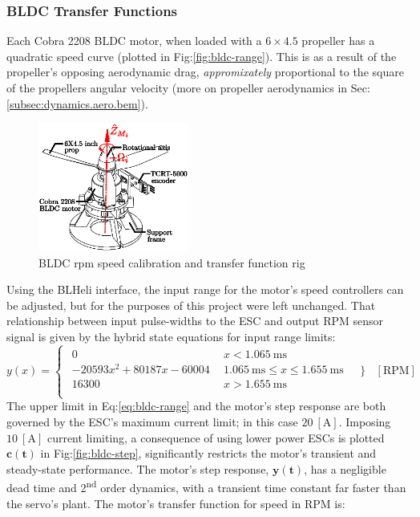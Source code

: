 \subsubsection*{BLDC Transfer Functions}
Each Cobra 2208 BLDC motor, when loaded with a $6\times4.5$ propeller has a quadratic speed curve (plotted in Fig:\ref{fig:bldc-range}). This is as a result of the propeller's opposing aerodynamic drag, \emph{appromixately} proportional to the square of the propellers angular velocity (more on propeller aerodynamics in Sec:\ref{subsec:dynamics.aero.bem}).
\begin{figure}[htbp]
\centering
\includegraphics[width=0.44\textwidth]{figs/bldc-rpm}
\caption{BLDC rpm speed calibration and transfer function rig}
\label{fig:bldc-rpm}
\vspace{-16pt}
\end{figure}
\par
Using the BLHeli interface, the input range for the motor's speed controllers can be adjusted, but for the purposes of this project were left unchanged. That relationship between input pulse-widths to the ESC and output RPM sensor signal is given by the hybrid state equations for input range limits:
\begin{equation}
y(x)=
\begin{cases}\begin{array}{ll}
0 & ~~x<1.065~\text{ms}\\
-20593x^2 + 80187x - 60004 & ~~1.065~\text{ms} \leq x \leq 1.655~\text{ms}\\
16300 & ~~x>1.655~\text{ms}\\
\end{array}
\end{cases}
~~~\Bigg\}~~~~[\text{RPM}]
\label{eq:bldc-range}
\end{equation}
The upper limit in Eq:\ref{eq:bldc-range} and the motor's step response are both governed by the ESC's maximum current limit; in this case $20~[\text{A}]$. Imposing $10~[\text{A}]$ current limiting, a consequence of using lower power ESCs is plotted {\color{YellowGreen}$\mathbf{c(t)}$} in Fig:\ref{fig:bldc-step}, significantly restricts the motor's transient and steady-state performance. The motor's step response, {\color{Purple}$\mathbf{y(t)}$}, has a negligible dead time and 2\textsuperscript{nd} order dynamics, with a transient time constant far faster than the servo's plant. The motor's transfer function for speed in RPM is:
